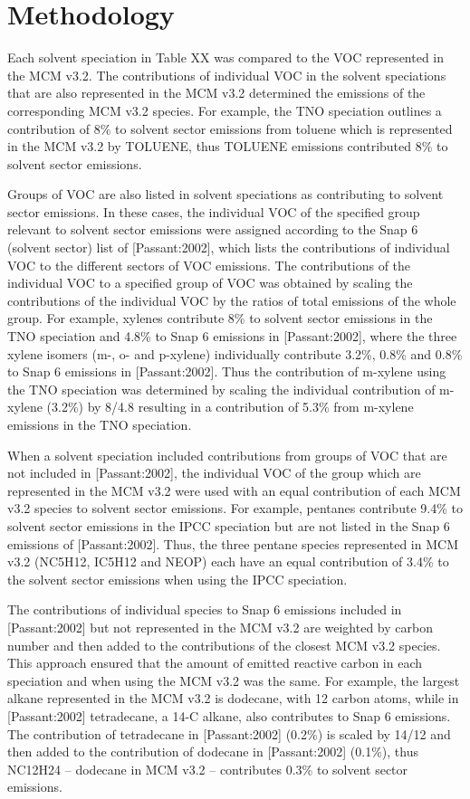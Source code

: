 \documentclass{article}
\begin{document}
\section*{Methodology}

Each solvent speciation in Table XX was compared to the VOC represented in the MCM v3.2.
The contributions of individual VOC in the solvent speciations that are also represented in the MCM v3.2 determined the emissions of the corresponding MCM v3.2 species.
For example, the TNO speciation outlines a contribution of 8\% to solvent sector emissions from toluene which is represented in the MCM v3.2 by TOLUENE, thus TOLUENE emissions contributed 8\% to solvent sector emissions.

Groups of VOC are also listed in solvent speciations as contributing to solvent sector emissions. 
In these cases, the individual VOC of the specified group relevant to solvent sector emissions were assigned according to the Snap 6 (solvent sector) list of [Passant:2002], which lists the contributions of individual VOC to the different sectors of VOC emissions.
The contributions of the individual VOC to a specified group of VOC was obtained by scaling the contributions of the individual VOC by the ratios of total emissions of the whole group.
For example, xylenes contribute 8\% to solvent sector emissions in the TNO speciation and 4.8\% to Snap 6 emissions in [Passant:2002], where the three xylene isomers (m-, o- and p-xylene) individually contribute 3.2\%, 0.8\% and 0.8\% to Snap 6 emissions in [Passant:2002].
Thus the contribution of m-xylene using the TNO speciation was determined by scaling the individual contribution of m-xylene (3.2\%) by 8/4.8 resulting in a contribution of 5.3\% from m-xylene emissions in the TNO speciation.

When a solvent speciation included contributions from groups of VOC that are not included in [Passant:2002], the individual VOC of the group which are represented in the MCM v3.2 were used with an equal contribution of each MCM v3.2 species to solvent sector emissions.
For example, pentanes contribute 9.4\% to solvent sector emissions in the IPCC speciation but are not listed in the Snap 6 emissions of [Passant:2002].
Thus, the three pentane species represented in MCM v3.2 (NC5H12, IC5H12 and NEOP) each have an equal contribution of 3.4\% to the solvent sector emissions when using the IPCC speciation.

The contributions of individual species to Snap 6 emissions included in [Passant:2002] but not represented in the MCM v3.2 are weighted by carbon number and then added to the contributions of the closest MCM v3.2 species.
This approach ensured that the amount of emitted reactive carbon in each speciation and when using the MCM v3.2 was the same.
For example, the largest alkane represented in the MCM v3.2 is dodecane, with 12 carbon atoms, while in [Passant:2002] tetradecane, a 14-C alkane, also contributes to Snap 6 emissions.
The contribution of tetradecane in [Passant:2002] (0.2\%) is scaled by 14/12 and then added to the contribution of dodecane in [Passant:2002] (0.1\%), thus NC12H24 -- dodecane in MCM v3.2 -- contributes 0.3\% to solvent sector emissions.
\end{document}
